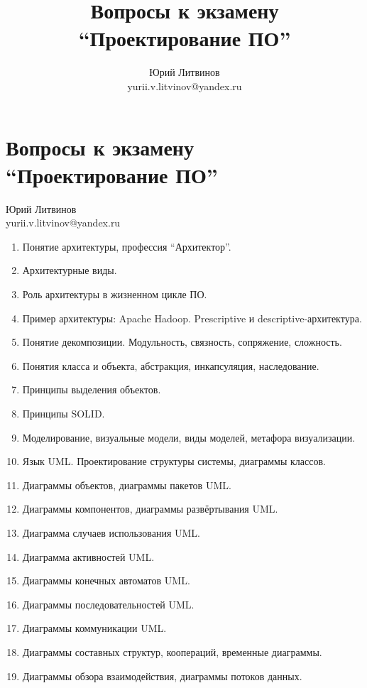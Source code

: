\documentclass[a5paper]{article}
\title{Вопросы к экзамену \enquote{Проектирование ПО}}
\author{Юрий Литвинов\\\small{yurii.v.litvinov@yandex.ru}}
\begin{document}
\thispagestyle{empty}

\section*{Вопросы к экзамену \enquote{Проектирование ПО}}

\begin{flushright}\begin{small}Юрий Литвинов\\\small{yurii.v.litvinov@yandex.ru}\end{small}\end{flushright}

\begin{enumerate}
    \item Понятие архитектуры, профессия \enquote{Архитектор}.
    \item Архитектурные виды.
    \item Роль архитектуры в жизненном цикле ПО.
    \item Пример архитектуры: Apache Hadoop. Prescriptive и descriptive-архитектура.
    \item Понятие декомпозиции. Модульность, связность, сопряжение, сложность.
    \item Понятия класса и объекта, абстракция, инкапсуляция, наследование. 
    \item Принципы выделения объектов.
    \item Принципы SOLID.
    \item Моделирование, визуальные модели, виды моделей, метафора визуализации.
    \item Язык UML. Проектирование структуры системы, диаграммы классов.
    \item Диаграммы объектов, диаграммы пакетов UML.
    \item Диаграммы компонентов, диаграммы развёртывания UML.
    \item Диаграмма случаев использования UML.
    \item Диаграмма активностей UML.
    \item Диаграммы конечных автоматов UML.
    \item Диаграммы последовательностей UML.
    \item Диаграммы коммуникации UML.
    \item Диаграммы составных структур, коопераций, временные диаграммы.
    \item Диаграммы обзора взаимодействия, диаграммы потоков данных.

\end{enumerate}
\end{document}
